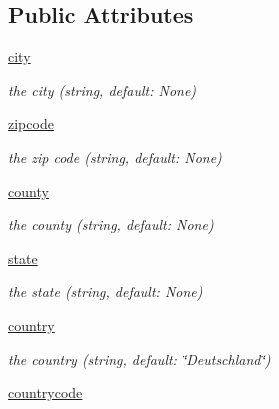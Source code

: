 \subsection*{Public Attributes}
\begin{DoxyCompactItemize}
\item 
\hypertarget{classgeors_1_1GeoLoc_a61510b2a72e53f080eb4577a93a5544f}{\hyperlink{classgeors_1_1GeoLoc_a61510b2a72e53f080eb4577a93a5544f}{city}}\label{classgeors_1_1GeoLoc_a61510b2a72e53f080eb4577a93a5544f}

\begin{DoxyCompactList}\small\item\em the city (string, default\-: None) \end{DoxyCompactList}\item 
\hypertarget{classgeors_1_1GeoLoc_a0d6a0704ea6b37dae91fceb128363122}{\hyperlink{classgeors_1_1GeoLoc_a0d6a0704ea6b37dae91fceb128363122}{zipcode}}\label{classgeors_1_1GeoLoc_a0d6a0704ea6b37dae91fceb128363122}

\begin{DoxyCompactList}\small\item\em the zip code (string, default\-: None) \end{DoxyCompactList}\item 
\hypertarget{classgeors_1_1GeoLoc_ab3c4d764d152b0aa73c766a3e8b85907}{\hyperlink{classgeors_1_1GeoLoc_ab3c4d764d152b0aa73c766a3e8b85907}{county}}\label{classgeors_1_1GeoLoc_ab3c4d764d152b0aa73c766a3e8b85907}

\begin{DoxyCompactList}\small\item\em the county (string, default\-: None) \end{DoxyCompactList}\item 
\hypertarget{classgeors_1_1GeoLoc_a65a154050406aad462d1f858332c28ba}{\hyperlink{classgeors_1_1GeoLoc_a65a154050406aad462d1f858332c28ba}{state}}\label{classgeors_1_1GeoLoc_a65a154050406aad462d1f858332c28ba}

\begin{DoxyCompactList}\small\item\em the state (string, default\-: None) \end{DoxyCompactList}\item 
\hypertarget{classgeors_1_1GeoLoc_a2d03502d18afd8b1e4a7802f71ef9a32}{\hyperlink{classgeors_1_1GeoLoc_a2d03502d18afd8b1e4a7802f71ef9a32}{country}}\label{classgeors_1_1GeoLoc_a2d03502d18afd8b1e4a7802f71ef9a32}

\begin{DoxyCompactList}\small\item\em the country (string, default\-: \char`\"{}\-Deutschland\char`\"{}) \end{DoxyCompactList}\item 
\hypertarget{classgeors_1_1GeoLoc_a0b8b5771e4e55088bf84e2e112c95c0e}{\hyperlink{classgeors_1_1GeoLoc_a0b8b5771e4e55088bf84e2e112c95c0e}{countrycode}}\label{classgeors_1_1GeoLoc_a0b8b5771e4e55088bf84e2e112c95c0e}


\end{DoxyCompactItemize}
